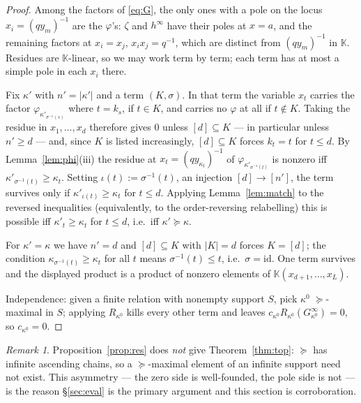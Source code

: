 \documentclass[11pt]{article}
\theoremstyle{definition}
\theoremstyle{remark}
\newtheorem{rem}[thm]{Remark}
\newcommand{\KK}{\mathbb{K}}
\newcommand{\Gi}[1]{G^{\infty}_{#1}}
\begin{document}
\begin{proof}
Among the factors of \eqref{eq:G}, the only ones with a pole on the locus
$x_i=(qy_m)^{-1}$ are the $\varphi$'s: $\zeta$ and $h^\infty$ have their poles at $x=a$, and
the remaining factors at $x_i=x_j$, $x_ix_j=q^{-1}$, which are distinct from
$(qy_m)^{-1}$ in $\KK$. Residues are $\KK$-linear, so we may work term by term; each term has
at most a simple pole in each $x_i$ there.

Fix $\kappa'$ with $n'=|\kappa'|$ and a term $(K,\sigma)$. In that term the variable $x_t$
carries the factor $\varphi_{\kappa'_{\sigma^{-1}(s)}}$ where $t=k_s$, if $t\in K$, and carries
no $\varphi$ at all if $t\notin K$. Taking the residue in $x_1,\dots,x_d$ therefore gives $0$
unless $[d]\subseteq K$ --- in particular unless $n'\ge d$ --- and, since $K$ is listed
increasingly, $[d]\subseteq K$ forces $k_t=t$ for $t\le d$. By Lemma~\ref{lem:phi}(iii) the
residue at $x_t=(qy_{\kappa_t})^{-1}$ of $\varphi_{\kappa'_{\sigma^{-1}(t)}}$ is nonzero iff
$\kappa'_{\sigma^{-1}(t)}\ge\kappa_t$. Setting $\iota(t):=\sigma^{-1}(t)$, an injection
$[d]\to[n']$, the term survives only if $\kappa'_{\iota(t)}\ge\kappa_t$ for $t\le d$. Applying
Lemma~\ref{lem:match} to the reversed inequalities (equivalently, to the order-reversing
relabelling) this is possible iff $\kappa'_t\ge\kappa_t$ for $t\le d$, i.e.\ iff
$\kappa'\succeq\kappa$.

For $\kappa'=\kappa$ we have $n'=d$ and $[d]\subseteq K$ with $|K|=d$ forces $K=[d]$; the
condition $\kappa_{\sigma^{-1}(t)}\ge\kappa_t$ for all $t$ means $\sigma^{-1}(t)\le t$, i.e.\
$\sigma=\mathrm{id}$. One term survives and the displayed product is a product of nonzero
elements of $\KK(x_{d+1},\dots,x_L)$.

Independence: given a finite relation with nonempty support $S$, pick $\kappa^0$
$\succeq$-maximal in $S$; applying $R_{\kappa^0}$ kills every other term and leaves
$c_{\kappa^0}R_{\kappa^0}(\Gi{\kappa^0})=0$, so $c_{\kappa^0}=0$.
\end{proof}

\begin{rem}
Proposition~\ref{prop:res} does \emph{not} give Theorem~\ref{thm:top}: $\succeq$ has infinite
ascending chains, so a $\succeq$-maximal element of an infinite support need not exist. This
asymmetry --- the zero side is well-founded, the pole side is not --- is the reason
\S\ref{sec:eval} is the primary argument and this section is corroboration.
\end{rem}
\end{document}
